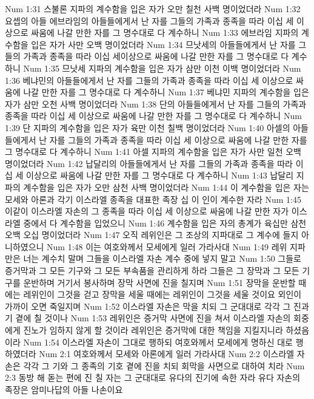 Num 1:31  스불론 지파의 계수함을 입은 자가 오만 칠천 사백 명이었더라
Num 1:32  요셉의 아들 에브라임의 아들들에게서 난 자를 그들의 가족과 종족을 따라 이십 세 이상으로 싸움에 나갈 만한 자를 그 명수대로 다 계수하니
Num 1:33  에브라임 지파의 계수함을 입은 자가 사만 오백 명이었더라
Num 1:34  므낫세의 아들들에게서 난 자를 그들의 가족과 종족을 따라 이십 세이상으로 싸움에 나갈 만한 자를 그 명수대로 다 계수하니
Num 1:35  므낫세 지파의 계수함을 입은 자가 삼만 이천 이백 명이었더라
Num 1:36  베냐민의 아들들에게서 난 자를 그들의 가족과 종족을 따라 이십 세 이상으로 싸움에 나갈 만한 자를 그 명수대로 다 계수하니
Num 1:37  베냐민 지파의 계수함을 입은 자가 삼만 오천 사백 명이었더라
Num 1:38  단의 아들들에게서 난 자를 그들의 가족과 종족을 따라 이십 세 이상으로 싸움에 나갈 만한 자를 그 명수대로 다 계수하니
Num 1:39  단 지파의 계수함을 입은 자가 육만 이천 칠백 명이었더라
Num 1:40  아셀의 아들들에게서 난 자를 그들의 가족과 종족을 따라 이십 세 이상으로 싸움에 나갈 만한 자를 그 명수대로 다 계수하니
Num 1:41  아셀 지파의 계수함을 입은 자가 사만 일천 오백 명이었더라
Num 1:42  납달리의 아들들에게서 난 자를 그들의 가족과 종족을 따라 이십 세 이상으로 싸움에 나갈 만한 자를 그 명수대로 다 계수하니
Num 1:43  납달리 지파의 계수함을 입은 자가 오만 삼천 사백 명이었더라
Num 1:44  이 계수함을 입은 자는 모세와 아론과 각기 이스라엘 종족을 대표한 족장 십 이 인이 계수한 자라
Num 1:45  이같이 이스라엘 자손의 그 종족을 따라 이십 세 이상으로 싸움에 나갈 만한 자가 이스라엘 중에서 다 계수함을 입었으니
Num 1:46  계수함을 입은 자의 총계가 육십만 삼천 오백 오십 명이었더라
Num 1:47  오직 레위인은 그 조상의 지파대로 그 계수에 들지 아니하였으니
Num 1:48  이는 여호와께서 모세에게 일러 가라사대
Num 1:49  레위 지파만은 너는 계수치 말며 그들을 이스라엘 자손 계수 중에 넣지 말고
Num 1:50  그들로 증거막과 그 모든 기구와 그 모든 부속품을 관리하게 하라 그들은 그 장막과 그 모든 기구를 운반하며 거기서 봉사하며 장막 사면에 진을 칠지며
Num 1:51  장막을 운반할 때에는 레위인이 그것을 걷고 장막을 세울 때에는 레위인이 그것을 세울 것이요 외인이 가까이 오면 죽일지며
Num 1:52  이스라엘 자손은 막을 치되 그 군대대로 각각 그 진과 기 곁에 칠 것이나
Num 1:53  레위인은 증거막 사면에 진을 쳐서 이스라엘 자손의 회중에게 진노가 임하지 않게 할 것이라 레위인은 증거막에 대한 책임을 지킬지니라 하셨음이라
Num 1:54  이스라엘 자손이 그대로 행하되 여호와께서 모세에게 명하신 대로 행하였더라
Num 2:1  여호와께서 모세와 아론에게 일러 가라사대
Num 2:2  이스라엘 자손은 각각 그 기와 그 종족의 기호 곁에 진을 치되 회막을 사면으로 대하여 치라
Num 2:3  동방 해 돋는 편에 진 칠 자는 그 군대대로 유다의 진기에 속한 자라 유다 자손의 족장은 암미나답의 아들 나손이요

